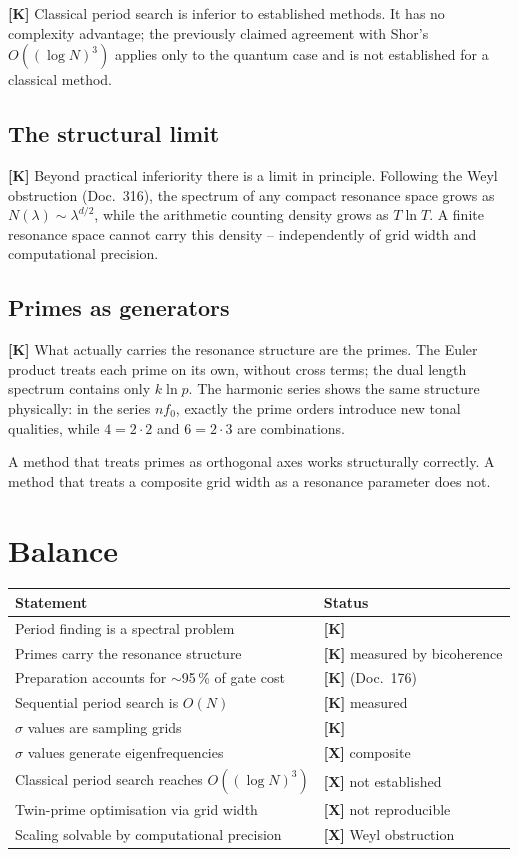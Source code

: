 \textbf{[K]} Classical period search is inferior to established methods. It has
no complexity advantage; the previously claimed agreement with Shor's
$O((\log N)^3)$ applies only to the quantum case and is not established for a
classical method.

\subsection{The structural limit}

\textbf{[K]} Beyond practical inferiority there is a limit in principle.
Following the Weyl obstruction (Doc.~316), the spectrum of any compact
resonance space grows as $N(\lambda) \sim \lambda^{d/2}$, while the arithmetic
counting density grows as $T\ln T$. A finite resonance space cannot carry this
density -- independently of grid width and computational precision.

\subsection{Primes as generators}

\textbf{[K]} What actually carries the resonance structure are the primes. The
Euler product treats each prime on its own, without cross terms; the dual length
spectrum contains only $k \ln p$. The harmonic series shows the same structure
physically: in the series $n f_0$, exactly the prime orders introduce new tonal
qualities, while $4 = 2\cdot2$ and $6 = 2\cdot3$ are combinations.

A method that treats primes as orthogonal axes works structurally correctly. A
method that treats a composite grid width as a resonance parameter does not.

\section{Balance}

\begin{center}
\begin{tabular}{ll}
\toprule
Statement & Status \\
\midrule
Period finding is a spectral problem & \textbf{[K]} \\
Primes carry the resonance structure & \textbf{[K]} measured by bicoherence \\
Preparation accounts for $\sim$95\,\% of gate cost & \textbf{[K]} (Doc.~176) \\
Sequential period search is $O(N)$ & \textbf{[K]} measured \\
$\sigma$ values are sampling grids & \textbf{[K]} \\
$\sigma$ values generate eigenfrequencies & \textbf{[X]} composite \\
Classical period search reaches $O((\log N)^3)$ & \textbf{[X]} not established \\
Twin-prime optimisation via grid width & \textbf{[X]} not reproducible \\
Scaling solvable by computational precision & \textbf{[X]} Weyl obstruction \\
\bottomrule
\end{tabular}
\end{center}

